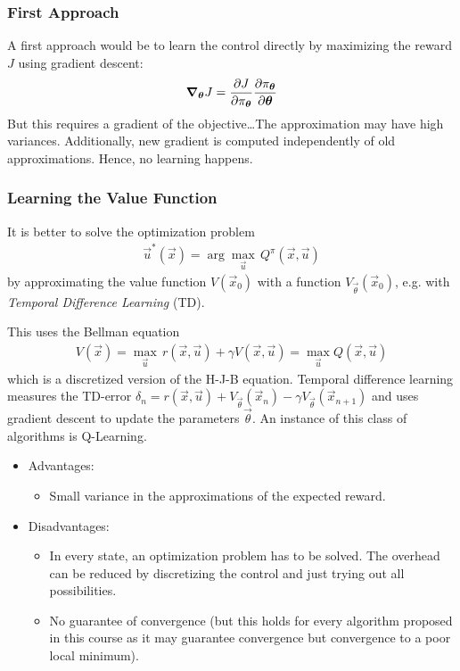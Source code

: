			\subsubsection{First Approach}
				A first approach would be to learn the control directly by maximizing the reward \( J \) using gradient descent:
				\begin{align*}
					\grad_{\bm{\theta}}{J} = \pdv{J}{\pi_{\bm{\theta}}} \pdv{\pi_{\bm{\theta}}}{\bm{\theta}}
				\end{align*}
				But this requires a gradient of the objective\dots The approximation may have high variances. Additionally, new gradient is computed independently of old approximations. Hence, no learning happens.

			\subsubsection{Learning the Value Function}
				It is better to solve the optimization problem
				\begin{align*}
					\vec{u}^\ast(\vec{x}) = \arg\max_{\vec{u}} \, Q^\pi(\vec{x}, \vec{u})
				\end{align*}
				by approximating the value function \( V(\vec{x}_0) \) with a function \( V_{\vec{\theta}}(\vec{x}_0) \), e.g. with \emph{Temporal Difference Learning} (TD).

				This uses the Bellman equation
				\begin{align*}
					V(\vec{x}) = \max_{\vec{u}} \, r(\vec{x}, \vec{u}) + \gamma V(\vec{x}, \vec{u}) = \max_{\vec{u}} Q(\vec{x}, \vec{u})
				\end{align*}
				which is a discretized version of the H-J-B equation. Temporal difference learning measures the TD-error \( \delta_n = r(\vec{x}, \vec{u}) + V_{\vec{\theta}}(\vec{x}_n) - \gamma V_{\vec{\theta}}(\vec{x}_{n + 1}) \) and uses gradient descent to update the parameters \(\vec{\theta}\). An instance of this class of algorithms is Q-Learning.

				\begin{itemize}
					\item Advantages:
						\begin{itemize}
							\item Small variance in the approximations of the expected reward.
						\end{itemize}
					\item Disadvantages:
						\begin{itemize}
							\item In every state, an optimization problem has to be solved. The overhead can be reduced by discretizing the control and just trying out all possibilities.
							\item No guarantee of convergence (but this holds for every algorithm proposed in this course as it may guarantee convergence but convergence to a poor local minimum).
						\end{itemize}
				\end{itemize}

